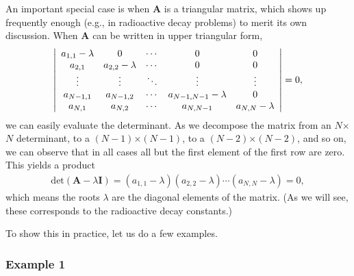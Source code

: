 An important special case is when $\mathbf{A}$ is a triangular matrix, which shows up frequently enough (e.g., in radioactive decay problems) to merit its own discussion. When $\mathbf{A}$ can be written in upper triangular form,
\begin{align}
  \left| \begin{array}{c c c c c} 
    a_{1,1} - \lambda   & 0   & \cdots & 0   & 0 \\
  	a_{2,1}   & a_{2,2} - \lambda   & \cdots & 0   & 0  \\
	\vdots    & \vdots    & \ddots  & \vdots      & \vdots   \\
	a_{N-1,1} & a_{N-1,2} & \cdots & a_{N-1,N-1} - \lambda & 0 \\ 
	a_{N,1}   & a_{N,2}   & \cdots & a_{N,N-1}   & a_{N,N}   - \lambda  \\ 
	\end{array} \right|  = 0, 
\end{align}
we can easily evaluate the determinant. As we decompose the matrix from an $N$$\times$$N$ determinant, to a $(N-1)$$\times$$(N-1)$, to a $(N-2)$$\times$$(N-2)$, and so on, we can observe that in all cases all but the first element of the first row are zero. This yields a product
\begin{align}
  \mathrm{det}(\mathbf{A} - \lambda \mathbf{I}) = ( a_{1,1} - \lambda ) ( a_{2,2} - \lambda ) \cdots ( a_{N,N} - \lambda ) = 0,
\end{align}
which means the roots $\lambda$ are the diagonal elements of the matrix. (As we will see, these corresponds to the radioactive decay constants.)

To show this in practice, let us do a few examples. 

\subsubsection{Example 1} 

